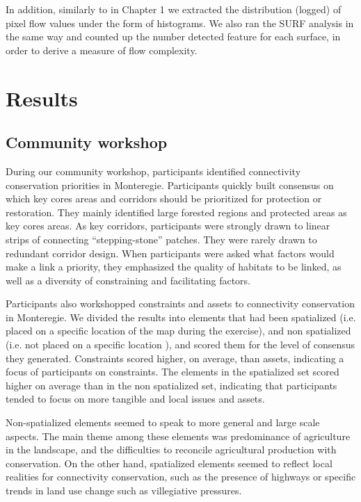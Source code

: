 In addition, similarly to in Chapter 1 we extracted the distribution (logged) of pixel flow values under the form of histograms. We also ran the SURF analysis in the same way and counted up the number detected feature for each surface, in order to derive a measure of flow complexity.\\

\section{Results}

\subsection{Community workshop}

During our community workshop, participants identified connectivity conservation priorities in Monteregie. Participants quickly built consensus on which key cores areas and corridors should be prioritized for protection or restoration. They mainly identified large forested regions and protected areas as key cores areas. As key corridors, participants were strongly drawn to linear strips of connecting “stepping-stone” patches. They were rarely drawn to redundant corridor design. When participants were asked what factors would make a link a priority, they emphasized the quality of habitats to be linked, as well as a diversity of constraining and facilitating factors.

Participants also workshopped constraints and assets to connectivity conservation in Monteregie. We divided the results into elements that had been spatialized (i.e. placed on a specific location of the map during the exercise), and non spatialized (i.e. not placed on a specific location ), and scored them for the level of consensus they generated. Constraints scored higher, on average, than assets, indicating a focus of participants on constraints. The elements in the spatialized set scored higher on average than in the non spatialized set, indicating that participants tended to focus on more tangible and local issues and assets.

Non-spatialized elements seemed to speak to more general and large scale aspects. The main theme among these elements was predominance of agriculture in the landscape, and the difficulties to reconcile agricultural production with conservation. On the other hand, spatialized elements seemed to reflect local realities for connectivity conservation, such as the presence of highways or specific trends in land use change such as villegiative pressures. \\

